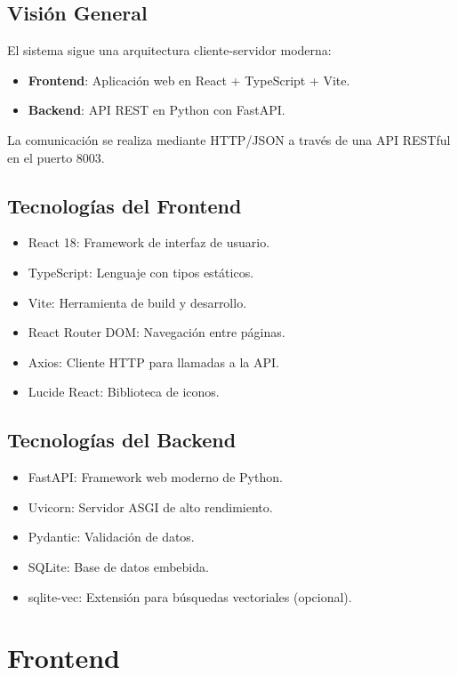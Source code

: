 \documentclass[12pt,a4paper]{article}
\begin{document}
\subsection{Visión General}
El sistema sigue una arquitectura cliente-servidor moderna:
\begin{itemize}
    \item \textbf{Frontend}: Aplicación web en React + TypeScript + Vite.
    \item \textbf{Backend}: API REST en Python con FastAPI.
\end{itemize}
La comunicación se realiza mediante HTTP/JSON a través de una API RESTful en el puerto 8003.

\subsection{Tecnologías del Frontend}
\begin{itemize}
    \item React 18: Framework de interfaz de usuario.
    \item TypeScript: Lenguaje con tipos estáticos.
    \item Vite: Herramienta de build y desarrollo.
    \item React Router DOM: Navegación entre páginas.
    \item Axios: Cliente HTTP para llamadas a la API.
    \item Lucide React: Biblioteca de iconos.
\end{itemize}

\subsection{Tecnologías del Backend}
\begin{itemize}
    \item FastAPI: Framework web moderno de Python.
    \item Uvicorn: Servidor ASGI de alto rendimiento.
    \item Pydantic: Validación de datos.
    \item SQLite: Base de datos embebida.
    \item sqlite-vec: Extensión para búsquedas vectoriales (opcional).
\end{itemize}

\section{Frontend}
\end{document}

